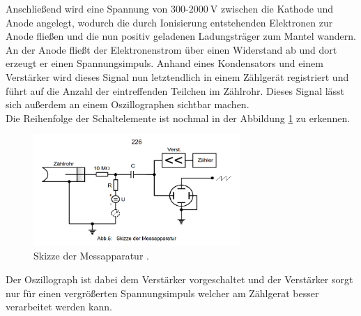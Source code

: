 Anschließend wird eine Spannung von $300$-$\SI{2000}{\volt}$ zwischen die Kathode und Anode angelegt, wodurch die durch Ionisierung entstehenden Elektronen zur Anode fließen
und die nun positiv geladenen Ladungsträger zum Mantel wandern. An der Anode fließt der Elektronenstrom über einen Widerstand ab und dort erzeugt er einen Spannungsimpuls.
Anhand eines Kondensators und einem Verstärker wird dieses Signal nun letztendlich in einem Zählgerät registriert und führt auf die Anzahl der eintreffenden Teilchen im Zählrohr.
Dieses Signal lässt sich außerdem an einem Oszillographen sichtbar machen.
\newline
\\
Die Reihenfolge der Schaltelemente ist nochmal in der Abbildung \ref{fig:geigermuellerpic2} zu erkennen.
\begin{figure}
  \centering
  \includegraphics[width=0.7\textwidth]{bilder/Abbildung2.png}
  \caption{Skizze der Messapparatur \cite{ap03}.}
  \label{fig:geigermuellerpic2}
\end{figure}
Der Oszillograph ist dabei dem Verstärker vorgeschaltet und der Verstärker sorgt nur für einen vergrößerten Spannungsimpuls welcher am Zählgerat besser verarbeitet werden kann.


